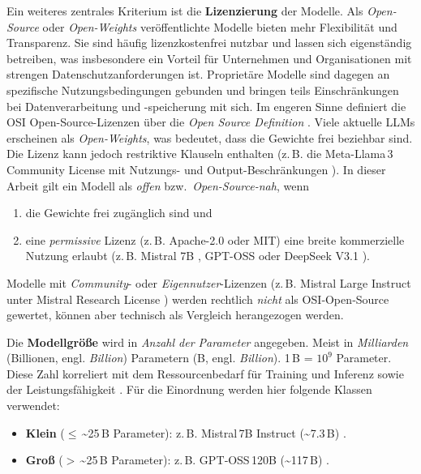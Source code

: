 Ein weiteres zentrales Kriterium ist die \textbf{Lizenzierung} der Modelle. Als \emph{Open-Source} oder \emph{Open-Weights} veröffentlichte Modelle bieten mehr Flexibilität und Transparenz. Sie sind häufig lizenzkostenfrei nutzbar und lassen sich eigenständig betreiben, was insbesondere ein Vorteil für Unternehmen und Organisationen mit strengen Datenschutzanforderungen ist. Proprietäre Modelle sind dagegen an spezifische Nutzungsbedingungen gebunden und bringen teils Einschränkungen bei Datenverarbeitung und -speicherung mit sich. Im engeren Sinne definiert die \ac{OSI} Open-Source-Lizenzen über die \emph{Open Source Definition} \cite{OSI_OSD}. Viele aktuelle \acp{LLM} erscheinen als \emph{Open-Weights}, was bedeutet, dass die Gewichte frei beziehbar sind. Die Lizenz kann jedoch restriktive Klauseln enthalten (z.\,B. die Meta-Llama\,3 Community License mit Nutzungs- und Output-Beschränkungen \cite{Llama3_License}). In dieser Arbeit gilt ein Modell als \emph{offen} bzw.\ \emph{Open-Source-nah}, wenn

\begin{enumerate}
    \item die Gewichte frei zugänglich sind und
    \item eine \emph{permissive} Lizenz (z.\,B. Apache-2.0 oder MIT) eine breite kommerzielle Nutzung erlaubt (z.\,B. Mistral 7B \cite{HF_Mistral7B_2025}, GPT-OSS \cite{OpenAI_GPTOSS_ModelCard_2025, OpenAI_GPTOSS_Blog_2025} oder DeepSeek V3.1 \cite{HF_DeepSeek_V3_1_2025}).
\end{enumerate}

Modelle mit \emph{Community}- oder \emph{Eigennutzer}-Lizenzen (z.\,B. Mistral Large Instruct unter Mistral Research License \cite{HF_MistralLargeInstruct_2025, MRL_Research_License}) werden rechtlich \emph{nicht} als \ac{OSI}‑Open‑Source gewertet, können aber technisch als Vergleich herangezogen werden.

Die \textbf{Modellgröße} wird in \emph{Anzahl der Parameter} angegeben. Meist in \emph{Milliarden} (Billionen, engl. \emph{Billion}) Parametern (B, engl. \emph{Billion}). 1\,B = \(10^9\) Parameter. Diese Zahl korreliert mit dem Ressourcenbedarf für Training und Inferenz sowie der Leistungsfähigkeit \cite{webdev-llm-sizes}. Für die Einordnung werden hier folgende Klassen verwendet:

\begin{itemize}
    \item \textbf{Klein} (\(\leq\)\,\textasciitilde{}25\,B Parameter): z.\,B. Mistral\,7B Instruct (\textasciitilde{}7.3\,B) \cite{HF_Mistral7B_2025}.
    \item \textbf{Groß} (\(>\)\,\textasciitilde{}25\,B Parameter): z.\,B. GPT‑OSS\,120B (\textasciitilde{}117\,B) \cite{OpenAI_GPTOSS_ModelCard_2025}.
\end{itemize}

